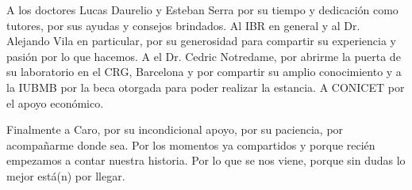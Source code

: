 \begin{acknowledgements}
A los doctores Lucas Daurelio y Esteban Serra por su tiempo y dedicación como tutores, por sus ayudas y consejos brindados.
Al IBR en general y al Dr. Alejando Vila en particular, por su generosidad para compartir su experiencia y pasión por lo que hacemos.
A el Dr. Cedric Notredame, por abrirme la puerta de su laboratorio en el CRG, Barcelona y por compartir su amplio conocimiento y a la IUBMB por la beca otorgada para poder realizar la estancia.
A CONICET por el apoyo económico.

Finalmente a Caro, por su incondicional apoyo, por su paciencia, por acompañarme donde sea.
Por los momentos ya compartidos y porque recién empezamos a contar nuestra historia.
Por lo que se nos viene, porque sin dudas lo mejor está(n) por llegar.

\end{acknowledgements}
